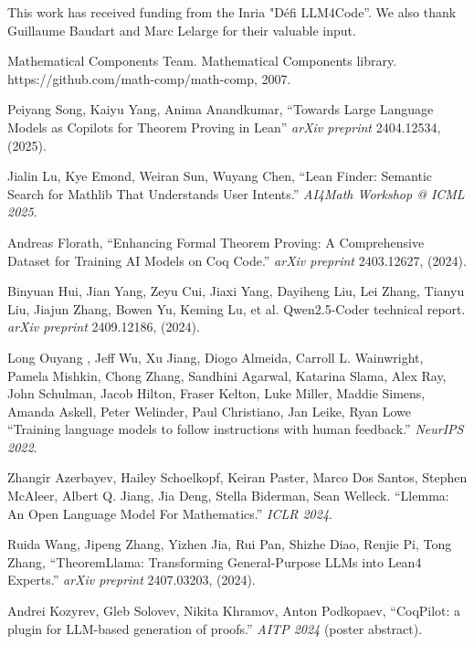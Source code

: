 \documentclass[11pt,a4paper]{article}
\begin{document}
This work has received funding from the Inria "Défi LLM4Code”. We also thank Guillaume Baudart and Marc Lelarge for their valuable input.



\begin{thebibliography}{9}

    Mathematical Components Team. Mathematical Components library.
    https://github.com/math-comp/math-comp, 2007.
    
    Peiyang Song, Kaiyu Yang, Anima Anandkumar,
    ``Towards Large Language Models as Copilots for Theorem Proving in Lean''
    \emph{arXiv preprint} 2404.12534, (2025).

    Jialin Lu, Kye Emond, Weiran Sun, Wuyang Chen,
    ``Lean Finder: Semantic Search for Mathlib That Understands User Intents.''
    \emph{AI4Math Workshop @ ICML 2025}.

    Andreas Florath,
    ``Enhancing Formal Theorem Proving: A Comprehensive Dataset for Training AI Models on Coq Code.''
    \emph{arXiv preprint} 2403.12627, (2024).

    Binyuan Hui, Jian Yang, Zeyu Cui, Jiaxi Yang, Dayiheng Liu, Lei Zhang, Tianyu Liu, Jiajun Zhang, Bowen
Yu, Keming Lu, et al. Qwen2.5-Coder technical report.
    \emph{arXiv preprint} 2409.12186, (2024).

    Long Ouyang , Jeff Wu, Xu Jiang, Diogo Almeida, Carroll L. Wainwright, Pamela Mishkin, Chong Zhang, Sandhini Agarwal, Katarina Slama, Alex Ray, John Schulman, Jacob Hilton, Fraser Kelton, Luke Miller, Maddie Simens, Amanda Askell, Peter Welinder, Paul Christiano, Jan Leike, Ryan Lowe
    ``Training language models to follow instructions with human feedback.''
    \emph{NeurIPS 2022}.

    Zhangir Azerbayev, Hailey Schoelkopf, Keiran Paster, Marco Dos Santos, Stephen McAleer, Albert Q. Jiang, Jia Deng, Stella Biderman, Sean Welleck.
    ``Llemma: An Open Language Model For Mathematics.''
    \emph{ICLR 2024}.
    
    Ruida Wang, Jipeng Zhang, Yizhen Jia, Rui Pan, Shizhe Diao, Renjie Pi, Tong Zhang,
    ``TheoremLlama: Transforming General-Purpose LLMs into Lean4 Experts.''
    \emph{arXiv preprint} 2407.03203, (2024).

    Andrei Kozyrev, Gleb Solovev, Nikita Khramov, Anton Podkopaev,
    ``CoqPilot: a plugin for LLM-based generation of proofs.''
    \emph{AITP 2024} (poster abstract).


\end{thebibliography}
\end{document}

